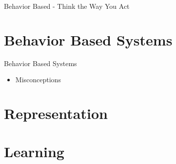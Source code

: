 \documentclass{beamer}
\begin{document}
\begin{frame}{Behavior Based - Think the Way You Act}
 
\end{frame}

\section{Behavior Based Systems}
\begin{frame}{Behavior Based Systems}
 \begin{itemize}
  \item Misconceptions
 \end{itemize}

\end{frame}

\section{Representation}
\section{Learning}
\end{document}
